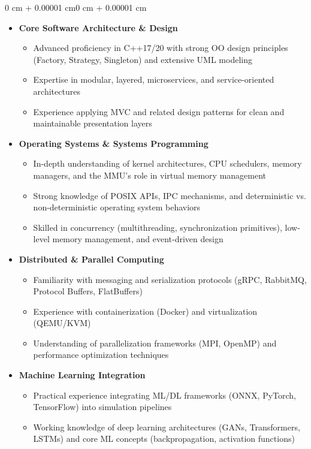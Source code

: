 \documentclass[11pt, letterpaper]{article}
\newenvironment{onecolentry}{
    \begin{adjustwidth}{0 cm + 0.00001 cm}{0 cm + 0.00001 cm}
}{
    \end{adjustwidth}
}
\begin{document}
\begin{onecolentry}
    \begin {itemize}[leftmargin=0.4 cm]
        \item \textbf{Core Software Architecture \& Design}
        \begin{itemize}
            \item Advanced proficiency in C++17/20 with strong OO design principles (Factory, Strategy, Singleton) and extensive UML modeling
            \item Expertise in modular, layered, microservices, and service-oriented architectures
            \item Experience applying MVC and related design patterns for clean and maintainable presentation layers
        \end{itemize}

        \item \textbf{Operating Systems \& Systems Programming}
        \begin{itemize}
            \item In-depth understanding of kernel architectures, CPU schedulers, memory managers, and the MMU’s role in virtual memory management
            \item Strong knowledge of POSIX APIs, IPC mechanisms, and deterministic vs. non-deterministic operating system behaviors
            \item Skilled in concurrency (multithreading, synchronization primitives), low-level memory management, and event-driven design
        \end{itemize}

        \item \textbf{Distributed \& Parallel Computing}
        \begin{itemize}
            \item Familiarity with messaging and serialization protocols (gRPC, RabbitMQ, Protocol Buffers, FlatBuffers)
            \item Experience with containerization (Docker) and virtualization (QEMU/KVM)
            \item Understanding of parallelization frameworks (MPI, OpenMP) and performance optimization techniques
        \end{itemize}

        \item \textbf{Machine Learning Integration}
        \begin{itemize}
            \item Practical experience integrating ML/DL frameworks (ONNX, PyTorch, TensorFlow) into simulation pipelines
            \item Working knowledge of deep learning architectures (GANs, Transformers, LSTMs) and core ML concepts (backpropagation, activation functions)
        \end{itemize}


\end{itemize}
\end{onecolentry}
\end{document}
